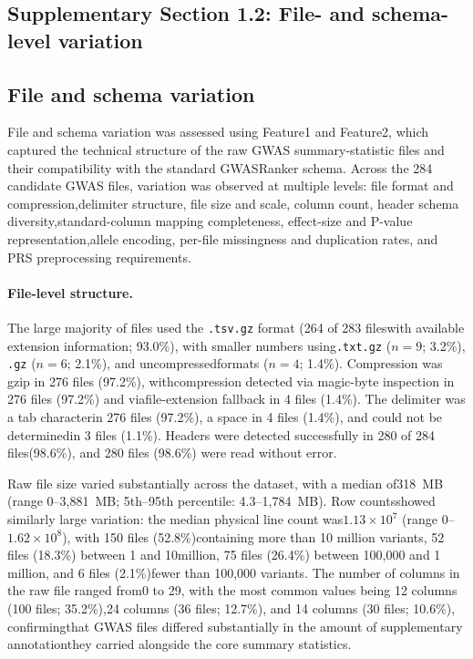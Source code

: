 \documentclass[11pt,a4paper]{article}
\begin{document}
\subsection*{Supplementary Section 1.2: File- and schema-level variation}

\subsection{File and schema variation}

File and schema variation was assessed using Feature1 and Feature2, which captured the technical structure of the raw GWAS summary-statistic files and their compatibility with the standard GWASRanker schema. Across the 284 candidate GWAS files, variation was observed at multiple levels: file format and compression,delimiter structure, file size and scale, column count, header schema diversity,standard-column mapping completeness, effect-size and P-value representation,allele encoding, per-file missingness and duplication rates, and PRS preprocessing requirements.

\paragraph{File-level structure.}The large majority of files used the \texttt{.tsv.gz} format (264 of 283 fileswith available extension information; 93.0\%), with smaller numbers using\texttt{.txt.gz} ($n=9$; 3.2\%), \texttt{.gz} ($n=6$; 2.1\%), and uncompressedformats ($n=4$; 1.4\%). Compression was gzip in 276 files (97.2\%), withcompression detected via magic-byte inspection in 276 files (97.2\%) and viafile-extension fallback in 4 files (1.4\%). The delimiter was a tab characterin 276 files (97.2\%), a space in 4 files (1.4\%), and could not be determinedin 3 files (1.1\%). Headers were detected successfully in 280 of 284 files(98.6\%), and 280 files (98.6\%) were read without error.

Raw file size varied substantially across the dataset, with a median of318~MB (range 0--3,881~MB; 5th--95th percentile: 4.3--1,784~MB). Row countsshowed similarly large variation: the median physical line count was$1.13 \times 10^{7}$ (range 0--$1.62 \times 10^{8}$), with 150 files (52.8\%)containing more than 10 million variants, 52 files (18.3\%) between 1 and 10million, 75 files (26.4\%) between 100,000 and 1 million, and 6 files (2.1\%)fewer than 100,000 variants. The number of columns in the raw file ranged from0 to 29, with the most common values being 12 columns (100 files; 35.2\%),24 columns (36 files; 12.7\%), and 14 columns (30 files; 10.6\%), confirmingthat GWAS files differed substantially in the amount of supplementary annotationthey carried alongside the core summary statistics.
\end{document}
